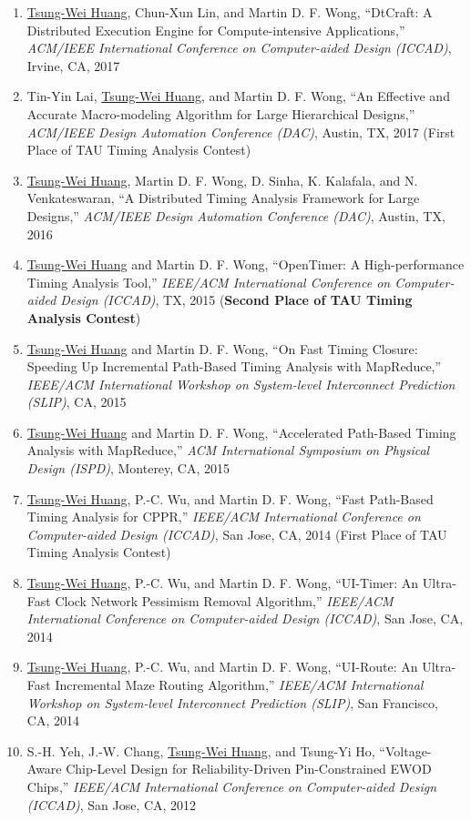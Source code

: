 \documentclass[A4,11pt]{article}
\begin{document}
\begin{enumerate}
    \item \underline{Tsung-Wei Huang}, Chun-Xun Lin, and Martin D. F. Wong, ``DtCraft: A Distributed Execution Engine for Compute-intensive Applications,'' \textit{ACM/IEEE International Conference on Computer-aided Design (ICCAD)}, Irvine, CA, 2017
    \item Tin-Yin Lai, \underline{Tsung-Wei Huang}, and Martin D. F. Wong, ``An Effective and Accurate Macro-modeling Algorithm for Large Hierarchical Designs,'' \textit{ACM/IEEE Design Automation Conference (DAC)}, Austin, TX, 2017 (First Place of TAU Timing Analysis Contest)
    \item \underline{Tsung-Wei Huang}, Martin D. F. Wong, D. Sinha, K. Kalafala, and N. Venkateswaran, ``A Distributed Timing Analysis Framework for Large Designs,'' \textit{ACM/IEEE Design Automation Conference (DAC)}, Austin, TX, 2016
    \item \underline{Tsung-Wei Huang} and Martin D. F. Wong, ``OpenTimer: A High-performance Timing Analysis Tool,'' \textit{IEEE/ACM International Conference on Computer-aided Design (ICCAD)}, TX, 2015 (\textbf{Second Place of TAU Timing Analysis Contest})
    \item \underline{Tsung-Wei Huang} and Martin D. F. Wong, ``On Fast Timing Closure: Speeding Up Incremental Path-Based Timing Analysis with MapReduce,'' \textit{IEEE/ACM International Workshop on System-level Interconnect Prediction (SLIP)}, CA, 2015
    \item \underline{Tsung-Wei Huang} and Martin D. F. Wong, ``Accelerated Path-Based Timing Analysis with MapReduce,'' \textit{ACM International Symposium on Physical Design (ISPD)}, Monterey, CA, 2015
    \item \underline{Tsung-Wei Huang}, P.-C. Wu, and Martin D. F. Wong, ``Fast Path-Based Timing Analysis for CPPR,'' \textit{IEEE/ACM International Conference on Computer-aided Design (ICCAD)}, San Jose, CA, 2014 (First Place of TAU Timing Analysis Contest)
    \item \underline{Tsung-Wei Huang}, P.-C. Wu, and Martin D. F. Wong, ``UI-Timer: An Ultra-Fast Clock Network Pessimism Removal Algorithm,'' \textit{IEEE/ACM International Conference on Computer-aided Design (ICCAD)}, San Jose, CA, 2014 
    \item \underline{Tsung-Wei Huang}, P.-C. Wu, and Martin D. F. Wong, ``UI-Route: An Ultra-Fast Incremental Maze Routing Algorithm,'' \textit{IEEE/ACM International Workshop on System-level Interconnect Prediction (SLIP)}, San Francisco, CA, 2014
    \item S.-H. Yeh, J.-W. Chang, \underline{Tsung-Wei Huang}, and Tsung-Yi Ho, ``Voltage-Aware Chip-Level Design for Reliability-Driven Pin-Constrained EWOD Chips,'' \textit{IEEE/ACM International Conference on Computer-aided Design (ICCAD)}, San Jose, CA, 2012

\end{enumerate}
\end{document}
